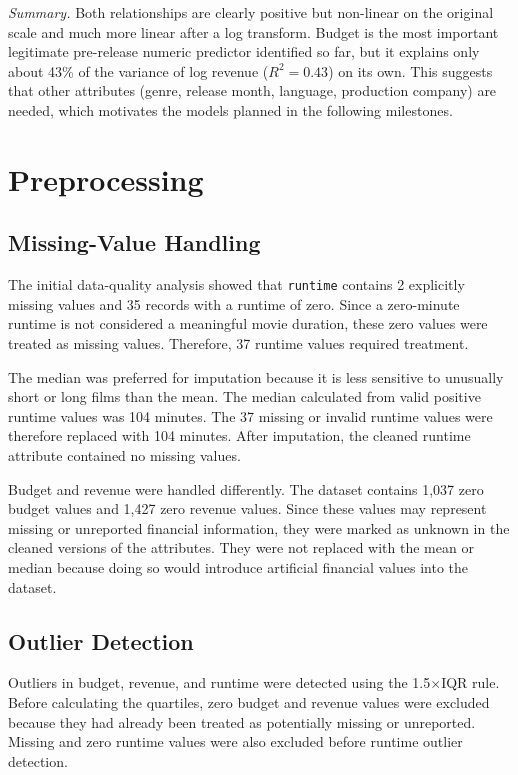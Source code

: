 \documentclass[conference]{IEEEtran}
\begin{document}
\textit{Summary.}
Both relationships are clearly positive but non-linear on the original
scale and much more linear after a log transform. Budget is the most
important legitimate pre-release numeric predictor identified so far,
but it explains only about 43\% of the variance of log revenue
($R^2 = 0.43$) on its own. This suggests that other attributes (genre,
release month, language, production company) are needed, which motivates
the models planned in the following milestones.
\section{Preprocessing}\label{sec:prep}

\subsection{Missing-Value Handling}

The initial data-quality analysis showed that \texttt{runtime} contains
2 explicitly missing values and 35 records with a runtime of zero.
Since a zero-minute runtime is not considered a meaningful movie
duration, these zero values were treated as missing values. Therefore,
37 runtime values required treatment.

The median was preferred for imputation because it is less sensitive
to unusually short or long films than the mean. The median calculated
from valid positive runtime values was 104 minutes. The 37 missing or
invalid runtime values were therefore replaced with 104 minutes.
After imputation, the cleaned runtime attribute contained no missing
values.

Budget and revenue were handled differently. The dataset contains
1,037 zero budget values and 1,427 zero revenue values. Since these
values may represent missing or unreported financial information, they
were marked as unknown in the cleaned versions of the attributes.
They were not replaced with the mean or median because doing so would
introduce artificial financial values into the dataset.


\subsection{Outlier Detection}

Outliers in budget, revenue, and runtime were detected using the
1.5$\times$IQR rule. Before calculating the quartiles, zero budget and
revenue values were excluded because they had already been treated as
potentially missing or unreported. Missing and zero runtime values were
also excluded before runtime outlier detection.
\end{document}
